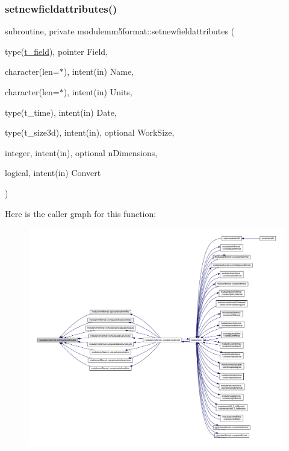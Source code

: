 \subsubsection{\texorpdfstring{setnewfieldattributes()}{setnewfieldattributes()}}
{\footnotesize\ttfamily subroutine, private modulemm5format\+::setnewfieldattributes (\begin{DoxyParamCaption}\item[{type(\mbox{\hyperlink{structmodulemm5format_1_1t__field}{t\+\_\+field}}), pointer}]{Field,  }\item[{character(len=$\ast$), intent(in)}]{Name,  }\item[{character(len=$\ast$), intent(in)}]{Units,  }\item[{type(t\+\_\+time), intent(in)}]{Date,  }\item[{type(t\+\_\+size3d), intent(in), optional}]{Work\+Size,  }\item[{integer, intent(in), optional}]{n\+Dimensions,  }\item[{logical, intent(in)}]{Convert }\end{DoxyParamCaption})\hspace{0.3cm}{\ttfamily [private]}}

Here is the caller graph for this function\+:\nopagebreak
\begin{figure}[H]
\begin{center}
\leavevmode
\includegraphics[width=350pt]{namespacemodulemm5format_afeeb0d8621c7c92d9be8dd4db8e1bf3d_icgraph}
\end{center}
\end{figure}
\mbox{\label{namespacemodulemm5format_a0042a10dda1e04b0a6aeb4d67aec1d11}} 
